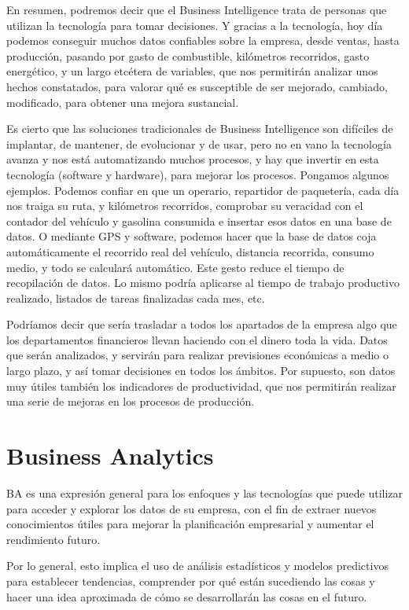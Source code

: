 \documentclass[12pt,a4paper]{report}
\begin{document}
En resumen, podremos decir que el Business Intelligence trata de personas que utilizan la tecnología para tomar decisiones. Y gracias a la tecnología, hoy día podemos conseguir muchos datos confiables sobre la empresa, desde ventas, hasta producción, pasando por gasto de combustible, kilómetros recorridos, gasto energético, y un largo etcétera de variables, que nos permitirán analizar unos hechos constatados, para valorar qué es susceptible de ser mejorado, cambiado, modificado, para obtener una mejora sustancial.

Es cierto que las soluciones tradicionales de Business Intelligence son difíciles de implantar, de mantener, de evolucionar y de usar, pero no en vano la tecnología avanza y nos está automatizando muchos procesos, y hay que invertir en esta tecnología (software y hardware), para mejorar los procesos. Pongamos algunos ejemplos. Podemos confiar en que un operario, repartidor de paquetería, cada día nos traiga su ruta, y kilómetros recorridos, comprobar su veracidad con el contador del vehículo y gasolina consumida e insertar esos datos en una base de datos. O mediante GPS y software, podemos hacer que la base de datos coja automáticamente el recorrido real del vehículo, distancia recorrida, consumo medio, y todo se calculará automático. Este gesto reduce el tiempo de recopilación de datos. Lo mismo podría aplicarse al tiempo de trabajo productivo realizado, listados de tareas finalizadas cada mes, etc.

Podríamos decir que sería trasladar a todos los apartados de la empresa algo que los departamentos financieros llevan haciendo con el dinero toda la vida. Datos que serán analizados, y servirán para realizar previsiones económicas a medio o largo plazo, y así tomar decisiones en todos los ámbitos. Por supuesto, son datos muy útiles también los indicadores de productividad, que nos permitirán realizar una serie de mejoras en los procesos de producción.

\section{Business Analytics}
BA es una expresión general para los enfoques y las tecnologías que puede utilizar para acceder y explorar los datos de su empresa, con el fin de extraer nuevos conocimientos útiles para mejorar la planificación empresarial y aumentar el rendimiento futuro.

Por lo general, esto implica el uso de análisis estadísticos y modelos predictivos para establecer tendencias, comprender por qué están sucediendo las cosas y hacer una idea aproximada de cómo se desarrollarán las cosas en el futuro.
\end{document}
